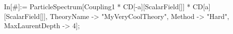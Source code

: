 In[\#]:= ParticleSpectrum[Coupling1 * CD[-a][ScalarField[]] * CD[a][ScalarField[]], TheoryName -> "MyVeryCoolTheory", Method -> "Hard", MaxLaurentDepth -> 4]; 